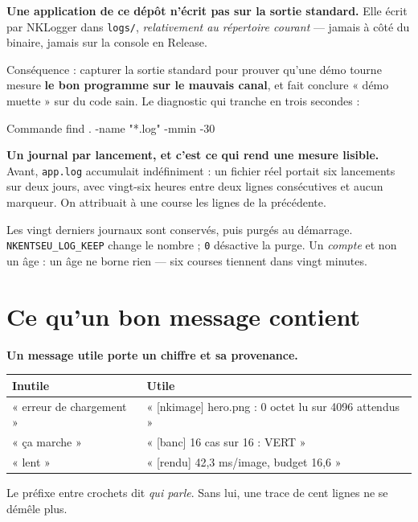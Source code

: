 \begin{nkpiege}
\textbf{Une application de ce dépôt n'écrit pas sur la sortie standard.} Elle
écrit par NKLogger dans \texttt{logs/}, \emph{relativement au répertoire
courant} --- jamais à côté du binaire, jamais sur la console en Release.

Conséquence : capturer la sortie standard pour prouver qu'une démo tourne mesure
\textbf{le bon programme sur le mauvais canal}, et fait conclure « démo muette »
sur du code sain. Le diagnostic qui tranche en trois secondes :

\begin{nkcode}{Commande}
find . -name "*.log" -mmin -30
\end{nkcode}
\end{nkpiege}

\begin{nkretenir}
\textbf{Un journal par lancement, et c'est ce qui rend une mesure lisible.}
Avant, \texttt{app.log} accumulait indéfiniment : un fichier réel portait six
lancements sur deux jours, avec vingt-six heures entre deux lignes consécutives
et aucun marqueur. On attribuait à une course les lignes de la précédente.

Les vingt derniers journaux sont conservés, puis purgés au démarrage.
\texttt{NKENTSEU\_LOG\_KEEP} change le nombre ; \texttt{0} désactive la purge.
Un \emph{compte} et non un âge : un âge ne borne rien --- six courses tiennent
dans vingt minutes.
\end{nkretenir}

\section{Ce qu'un bon message contient}

\begin{nkretenir}
\textbf{Un message utile porte un chiffre et sa provenance.}

\begin{center}
\begin{tabular}{@{}ll@{}}
\toprule
\textbf{Inutile} & \textbf{Utile} \\
\midrule
« erreur de chargement » & « [nkimage] hero.png : 0 octet lu sur 4096 attendus » \\
« ça marche » & « [banc] 16 cas sur 16 : VERT » \\
« lent » & « [rendu] 42,3 ms/image, budget 16,6 » \\
\bottomrule
\end{tabular}
\end{center}

Le préfixe entre crochets dit \emph{qui parle}. Sans lui, une trace de cent
lignes ne se démêle plus.
\end{nkretenir}

